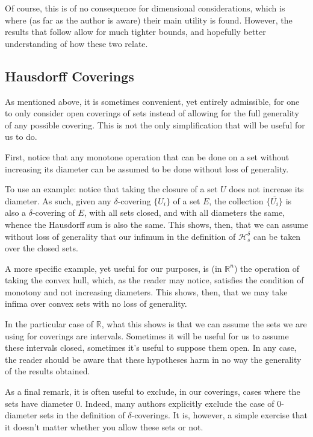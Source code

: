 \documentclass[11pt]{amsart}
\newcommand{\R}{\mathbb{R}}
\newcommand{\HH}{\mathcal{H}}
\begin{document}
Of course, this is of no consequence for dimensional considerations, which is where (as far as the author is aware) their main utility is found. However, the results that follow allow for much tighter bounds, and hopefully better understanding of how these two relate.

\subsection{Hausdorff Coverings}

As mentioned above, it is sometimes convenient, yet entirely admissible, for one to only consider open coverings of sets instead of allowing for the full generality of any possible covering. This is not the only simplification that will be useful for us to do.

First, notice that any monotone operation that can be done on a set without increasing its diameter can be assumed to be done without loss of generality.

To use an example: notice that taking the closure of a set $U$ does not increase its diameter. As such, given any $\delta$-covering $\{U_i\}$ of a set $E$, the collection $\{ \overline{U_i} \}$ is also a $\delta$-covering of $E$, with all sets closed, and with all diameters the same, whence the Hausdorff sum is also the same. This shows, then, that we can assume without loss of generality that our infimum in the definition of $\HH_s^\delta$ can be taken over the closed sets.

A more specific example, yet useful for our purposes, is (in $\R^n$) the operation of taking the convex hull, which, as the reader may notice, satisfies the condition of monotony and not increasing diameters. This shows, then, that we may take infima over convex sets with no loss of generality.

In the particular case of $\R$, what this shows is that we can assume the sets we are using for coverings are intervals. Sometimes it will be useful for us to assume these intervals closed, sometimes it's useful to suppose them open. In any case, the reader should be aware that these hypotheses harm in no way the generality of the results obtained.

As a final remark, it is often useful to exclude, in our coverings, cases where the sets have diameter 0. Indeed, many authors explicitly exclude the case of 0-diameter sets in the definition of $\delta$-coverings. It is, however, a simple exercise that it doesn't matter whether you allow these sets or not.
\end{document}
